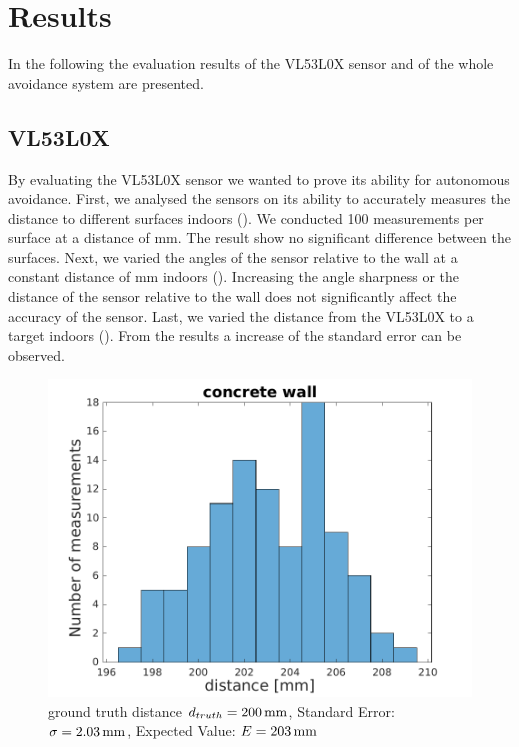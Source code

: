 \chapter{Results}
In the following the evaluation results of the VL53L0X sensor and of the whole avoidance system are presented. 
\section{VL53L0X}
\label{sec:vl53l0x}
By evaluating the VL53L0X sensor we wanted to prove its ability for autonomous avoidance. 
First, we analysed the sensors on its ability to accurately measures the distance to different surfaces indoors (). We conducted 100 measurements per surface at a distance of \unit[200]{mm}. The result show no significant difference between the surfaces. Next, we varied the angles of the sensor relative to the wall at a constant distance of \unit[200]{mm} indoors (). Increasing the angle sharpness or the distance of the sensor relative to the wall does not significantly affect the accuracy of the sensor. Last, we varied the distance from the VL53L0X to a target indoors (). From the results a increase of the standard error can be observed.\\


\begin{figure}
		\centering
		\includegraphics[width=0.9\linewidth]{pictures/concrete_hist.pdf}
		\caption{ground truth distance $d_{truth}= \unit[200]{mm}$, Standard Error: $\sigma=\unit[2.03]{mm}$, Expected Value: $E=\unit[203]{mm}$}
		\label{fig:surface_hist_con}
\end{figure}

